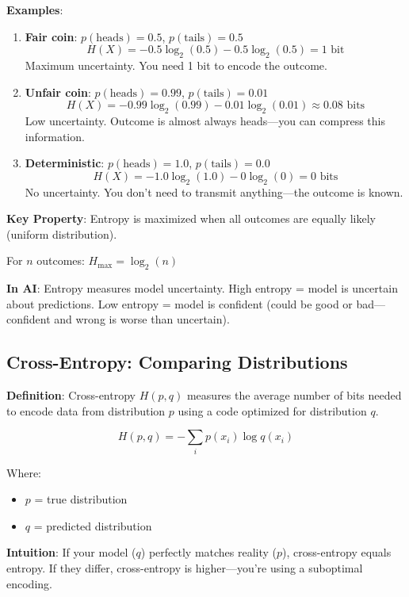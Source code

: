 \documentclass[11pt,oneside]{book}
\begin{document}
\textbf{Examples}:

\begin{enumerate}
\item \textbf{Fair coin}: $p(\text{heads}) = 0.5$, $p(\text{tails}) = 0.5$
\[
H(X) = -0.5 \log_2(0.5) - 0.5 \log_2(0.5) = 1 \text{ bit}
\]
Maximum uncertainty. You need 1 bit to encode the outcome.

\item \textbf{Unfair coin}: $p(\text{heads}) = 0.99$, $p(\text{tails}) = 0.01$
\[
H(X) = -0.99 \log_2(0.99) - 0.01 \log_2(0.01) \approx 0.08 \text{ bits}
\]
Low uncertainty. Outcome is almost always heads---you can compress this information.

\item \textbf{Deterministic}: $p(\text{heads}) = 1.0$, $p(\text{tails}) = 0.0$
\[
H(X) = -1.0 \log_2(1.0) - 0 \log_2(0) = 0 \text{ bits}
\]
No uncertainty. You don't need to transmit anything---the outcome is known.
\end{enumerate}

\textbf{Key Property}: Entropy is maximized when all outcomes are equally likely (uniform distribution).

For $n$ outcomes: $H_{\max} = \log_2(n)$

\textbf{In AI}: Entropy measures model uncertainty. High entropy = model is uncertain about predictions. Low entropy = model is confident (could be good or bad---confident and wrong is worse than uncertain).

\subsection{Cross-Entropy: Comparing Distributions}

\textbf{Definition}: Cross-entropy $H(p, q)$ measures the average number of bits needed to encode data from distribution $p$ using a code optimized for distribution $q$.

\[
H(p, q) = -\sum_{i} p(x_i) \log q(x_i)
\]

Where:
\begin{itemize}
\item $p$ = true distribution
\item $q$ = predicted distribution
\end{itemize}

\textbf{Intuition}: If your model ($q$) perfectly matches reality ($p$), cross-entropy equals entropy. If they differ, cross-entropy is higher---you're using a suboptimal encoding.
\end{document}

